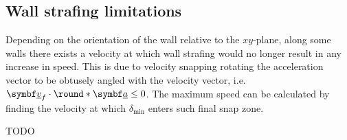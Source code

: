 \subsection{Wall strafing limitations}
\label{sec:wall_strafing_limits}
Depending on the orientation of the wall relative to the $xy$-plane, along some walls there exists a velocity at which wall strafing would no longer result in any increase in speed.
This is due to velocity snapping rotating the acceleration vector to be obtusely angled with the velocity vector, i.e. $\vec{\flat{v}}_f \cdot \round*{\vec{\flat{a}}} \le 0$.
The maximum speed can be calculated by finding the velocity at which $\delta_{\min}$ enters such final snap zone.

TODO
